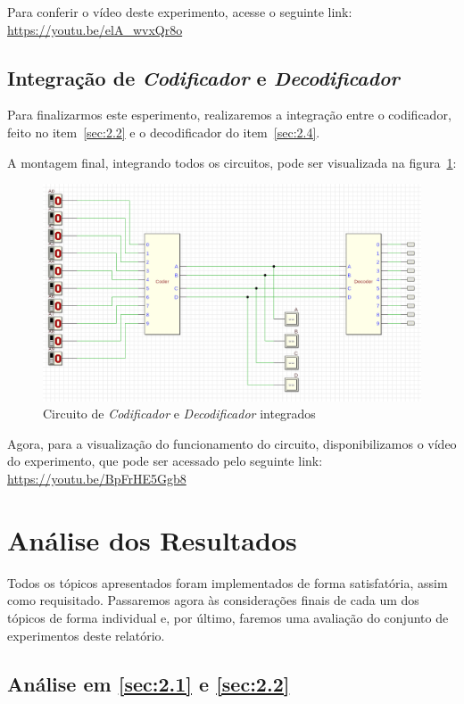\documentclass[12pt]{article}
\begin{document}
Para conferir o vídeo deste experimento, acesse o seguinte link:
\href{https://youtu.be/elA_wvxQr8o}{https://youtu.be/elA_wvxQr8o}

\subsection{Integração de \emph{Codificador} e \emph{Decodificador}}\label{sec:2.5}

Para finalizarmos este esperimento, realizaremos a integração entre o
codificador, feito no item~\ref{sec:2.2} e o decodificador do
item~\ref{sec:2.4}.

A montagem final, integrando todos os circuitos, pode ser visualizada na
figura~\ref{fig:Exp5__2_5_circuit.png}:

\begin{figure}[htp]
    \centering
    \includegraphics[width=12cm]{Exp05/Exp5__2_5_circuit.png}
    \caption{Circuito de \emph{Codificador} e \emph{Decodificador} integrados}
    \label{fig:Exp5__2_5_circuit.png}
\end{figure}

Agora, para a visualização do funcionamento do circuito, disponibilizamos o
vídeo do experimento, que pode ser acessado pelo seguinte link:
\href{https://youtu.be/BpFrHE5Ggb8}{https://youtu.be/BpFrHE5Ggb8}

\section{Análise dos Resultados}
\label{sec:resultados}
Todos os tópicos apresentados foram implementados de forma satisfatória, assim
como requisitado. Passaremos agora às considerações finais de cada um dos
tópicos de forma individual e, por último, faremos uma avaliação do conjunto de
experimentos deste relatório.

\subsection{Análise em \ref{sec:2.1} e \ref{sec:2.2}}\label{sec:analise2.1}
\end{document}
